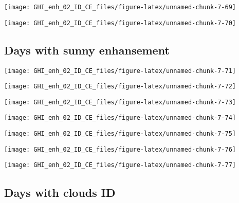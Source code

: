 \documentclass[
  10pt,
  a4paper,oneside]{article}
\begin{document}
\begin{center}\texttt{[image: GHI\_enh\_02\_ID\_CE\_files/figure-latex/unnamed-chunk-7-69]} \end{center}

\begin{center}\texttt{[image: GHI\_enh\_02\_ID\_CE\_files/figure-latex/unnamed-chunk-7-70]} \end{center}

\FloatBarrier

\hypertarget{days-with-sunny-enhansement}{%
\subsection{Days with sunny enhansement}\label{days-with-sunny-enhansement}}

\begin{center}\texttt{[image: GHI\_enh\_02\_ID\_CE\_files/figure-latex/unnamed-chunk-7-71]} \end{center}

\begin{center}\texttt{[image: GHI\_enh\_02\_ID\_CE\_files/figure-latex/unnamed-chunk-7-72]} \end{center}

\begin{center}\texttt{[image: GHI\_enh\_02\_ID\_CE\_files/figure-latex/unnamed-chunk-7-73]} \end{center}

\begin{center}\texttt{[image: GHI\_enh\_02\_ID\_CE\_files/figure-latex/unnamed-chunk-7-74]} \end{center}

\begin{center}\texttt{[image: GHI\_enh\_02\_ID\_CE\_files/figure-latex/unnamed-chunk-7-75]} \end{center}

\begin{center}\texttt{[image: GHI\_enh\_02\_ID\_CE\_files/figure-latex/unnamed-chunk-7-76]} \end{center}

\begin{center}\texttt{[image: GHI\_enh\_02\_ID\_CE\_files/figure-latex/unnamed-chunk-7-77]} \end{center}

\FloatBarrier

\hypertarget{days-with-clouds-id}{%
\subsection{Days with clouds ID}\label{days-with-clouds-id}}
\end{document}
